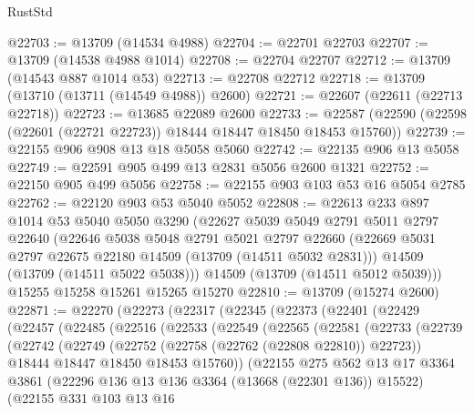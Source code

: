 \begin{lexlean}{RustStd}
\begin{coremodule}
@22703 := @13709 (@14534 @4988)
@22704 := @22701 @22703
@22707 := @13709 (@14538 @4988 @1014)
@22708 := @22704 @22707
@22712 := @13709 (@14543 @887 @1014 @53)
@22713 := @22708 @22712
@22718 := @13709 (@13710 (@13711 (@14549 @4988)) @2600)
@22721 := @22607 (@22611 (@22713 @22718))
@22723 := @13685 @22089 @2600
@22733 := @22587 (@22590 (@22598 (@22601 (@22721 @22723)) @18444 @18447 @18450 @18453 @15760))
@22739 := @22155 @906 @908 @13 @18 @5058 @5060
@22742 := @22135 @906 @13 @5058
@22749 := @22591 @905 @499 @13 @2831 @5056 @2600 @1321
@22752 := @22150 @905 @499 @5056
@22758 := @22155 @903 @103 @53 @16 @5054 @2785
@22762 := @22120 @903 @53 @5040 @5052
@22808 := @22613
    @233
    @897
    @1014
    @53
    @5040
    @5050
    @3290
    (@22627
      @5039
      @5049
      @2791
      @5011
      @2797
      @22640
      (@22646
        @5038
        @5048
        @2791
        @5021
        @2797
        @22660
        (@22669 @5031 @2797 @22675 @22180 @14509 (@13709 (@14511 @5032 @2831)))
        @14509
        (@13709 (@14511 @5022 @5038)))
      @14509
      (@13709 (@14511 @5012 @5039)))
    @15255
    @15258
    @15261
    @15265
    @15270
@22810 := @13709 (@15274 @2600)
@22871 := @22270
    (@22273
      (@22317
        (@22345
          (@22373
            (@22401
              (@22429
                (@22457
                  (@22485
                    (@22516
                      (@22533
                        (@22549
                          (@22565
                            (@22581
                              (@22733
                                (@22739
                                  (@22742
                                    (@22749
                                      (@22752 (@22758 (@22762 (@22808 @22810)) @22723))
                                      @18444
                                      @18447
                                      @18450
                                      @18453
                                      @15760))
                                  (@22155
                                    @275
                                    @562
                                    @13
                                    @17
                                    @3364
                                    @3861
                                    (@22296 @136 @13 @136 @3364 (@13668 (@22301 @136)) @15522)
                                    (@22155
                                      @331
                                      @103
                                      @13
                                      @16

\end{coremodule}
\end{lexlean}
